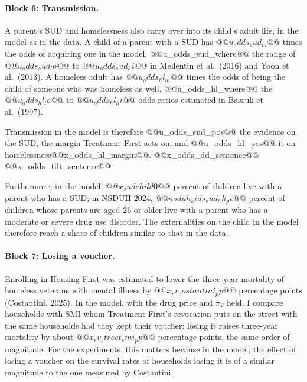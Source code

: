 \documentclass[10pt]{article}
\begin{document}
\paragraph{Block 6: Transmission.} A parent's SUD and homelessness also carry over into its child's adult life, in the model as in the data. A child of a parent with a SUD has $@@u_odds_sud_m@@$ times the odds of acquiring one in the model, @@u_odds_sud_where@@ the range of $@@u_odds_sud_lo@@$ to $@@u_odds_sud_hi@@$ in Mellentin et al.\ (2016) and Yoon et al.\ (2013).  A homeless adult has $@@u_odds_hl_m@@$ times the odds of being the child of someone who was homeless as well, @@u_odds_hl_where@@ the $@@u_odds_hl_lo@@$ to $@@u_odds_hl_hi@@$ odds ratios estimated in Bassuk et al.\ (1997).

Transmission in the model is therefore @@u_odds_sud_pos@@ the evidence on the SUD, the margin Treatment First acts on, and @@u_odds_hl_pos@@ it on homelessness@@x_odds_hl_margin@@. @@x_odds_dd_sentence@@ @@x_odds_tilt_sentence@@

Furthermore, in the model, $@@x_sudchild0@@$ percent of children live with a parent who has a SUD; in NSDUH 2024, $@@nsduh_kids_sud_hh_pc@@$ percent of children whose parents are aged 26 or older live with a parent who has a moderate or severe drug use disorder. The externalities on the child in the model therefore reach a share of children similar to that in the data.

\paragraph{Block 7: Losing a voucher.} Enrolling in Housing First was estimated to lower the three-year mortality of homeless veterans with mental illness by $@@x_rv_costantini_pp@@$ percentage points (Costantini, 2025). In the model, with the drug price and $\pi_V$ held, I compare households with SMI whom Treatment First's revocation puts on the street with the same households had they kept their voucher: losing it raises three-year mortality by about $@@x_rv_street_smi_pp@@$ percentage points, the same order of magnitude.   For the experiments, this matters because in the model, the effect of losing a voucher on the survival rates of households losing it is of a similar magnitude to the one measured by Costantini.
\end{document}
